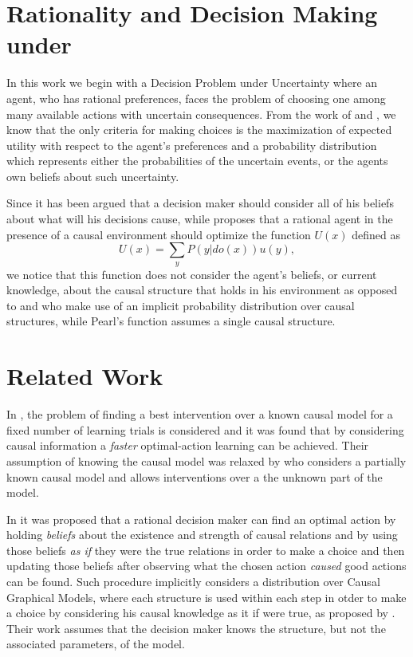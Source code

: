 \documentclass[letterpaper]{article}
\begin{document}
\section{Rationality and Decision Making under}
In this work we begin with a Decision Problem under Uncertainty where an agent, who has rational preferences, faces the problem of choosing one among many available actions with uncertain consequences. From the work of \cite{von1944theory} and \cite{savage1954the}, we know that the only criteria for making choices is the maximization of expected utility with respect to the agent's preferences and a probability distribution which represents either the probabilities of the uncertain events, or the agents own beliefs about such uncertainty. 

Since \cite{joyce1999foundations} it has been argued that a decision maker should consider all of his beliefs about what will his decisions cause, while \cite{pearl2009causality} proposes that a rational agent in the presence of a causal environment should optimize the function $U(x)$ defined as 
\[ U(x)=\sum_y P(y | do(x)) u(y), \]
we notice that this function does not consider the agent's beliefs, or current knowledge, about the causal structure that holds in his environment as opposed to \cite{gonzalez2018playing} and \cite{2019arXiv190202279G} who make use of an implicit probability distribution over causal structures, while Pearl's function assumes a single causal structure. 

\section{Related Work}
In \cite{lattimoreNIPS2016}, the problem of finding a best intervention over a known causal model for a fixed number of learning trials is considered and it was found that by considering causal information a \textit{faster} optimal-action learning can be achieved. Their assumption of knowing the causal model was relaxed by \cite{sen2017identifying} who considers a partially known causal model and allows interventions over a the unknown part of the model. 

In \cite{gonzalez2018playing} it was proposed that a rational decision maker can find an optimal action by holding \textit{beliefs} about the existence and strength of causal relations and by using those beliefs \textit{as if} they were the true relations in order to make a choice and then updating those beliefs after observing what the chosen action \textit{caused} good actions can be found. Such procedure implicitly considers a distribution over Causal Graphical Models, where each structure is used within each step in otder to make a choice by considering his causal knowledge as it if were true, as proposed by \cite{joyce1999foundations}. Their work assumes that the decision maker knows the structure, but not the associated parameters, of the model. 
\end{document}
